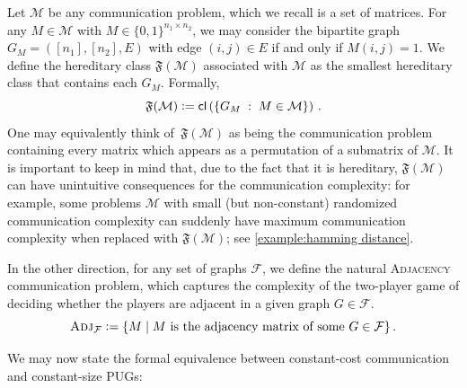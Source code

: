 \documentclass{theoretics}
\newcommand{\define}{\vcentcolon=}
\newcommand{\zo}{\{0,1\}}
\newcommand{\cF}{\ensuremath{\mathcal{F}}}
\newcommand{\cM}{\ensuremath{\mathcal{M}}}
\newcommand{\Adj}{\textsc{Adj}}
\newcommand{\cl}{\mathsf{cl}}
\begin{document}
Let $\cM$ be any communication problem, which we recall is a set of matrices. For any $M \in \cM$
with $M \in \zo^{n_1 \times n_2}$, we may consider the bipartite graph $G_M = ([n_1], [n_2], E)$
with edge $(i,j) \in E$ if and only if $M(i,j) = 1$.  We define the hereditary class
$\mathfrak{F}(\cM)$ associated with $\cM$ as the smallest hereditary class that contains each $G_M$. Formally,
\[
  \mathfrak{F}(\cM) \define \cl\left( \{ G_M \;:\; M \in \cM \} \right) \,.
\]
One may equivalently think of $\,\mathfrak{F}(\cM)$ as being the communication problem containing
every matrix which appears as a permutation of a submatrix of $\cM$.  It is important to keep in
mind that, due to the fact that it is hereditary, $\mathfrak{F}(\cM)$ can have unintuitive
consequences for the communication complexity: for example, some problems $\cM$ with small (but
non-constant) randomized communication complexity can suddenly have maximum communication complexity
when replaced with $\mathfrak{F}(\cM)$; see \cref{example:hamming distance}.

In the other direction, for any set of graphs $\cF$, we define the natural \textsc{Adjacency}
communication problem, which captures the complexity of the two-player game of deciding
whether the players are adjacent in a given graph $G \in \cF$. 
\[
  \Adj_\cF \define \{ M \;|\; M \text{ is the adjacency matrix of some } G\in \cF \} \,.
\]

We may now state the formal equivalence between constant-cost communication and constant-size PUGs:
\end{document}
